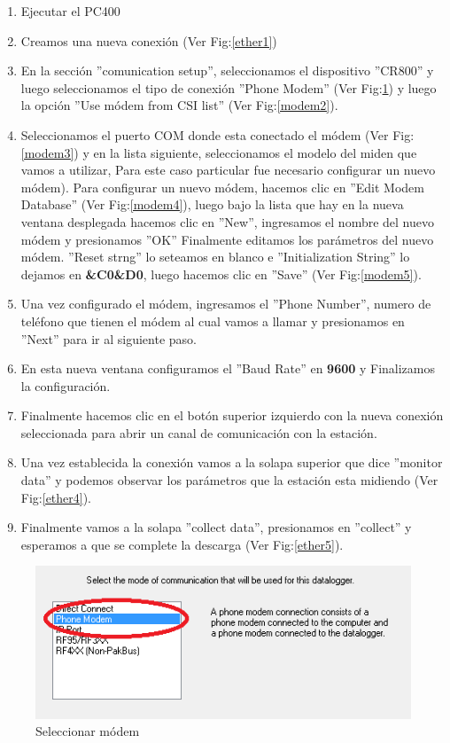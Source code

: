 \begin{enumerate}
\item Ejecutar el PC400
\item Creamos una nueva conexión (Ver Fig:\ref{ether1})
\item En la sección ''comunication setup'', seleccionamos el dispositivo ''CR800'' y luego seleccionamos el tipo de conexión ''Phone Modem'' (Ver Fig:\ref{modem1}) y luego la opción ''Use módem from CSI list'' (Ver Fig:\ref{modem2}).
\item Seleccionamos el puerto COM donde esta conectado el módem (Ver Fig:\ref{modem3}) y en la lista siguiente, seleccionamos el modelo del miden que vamos a utilizar, Para este caso particular fue necesario configurar un nuevo módem).
\subitem Para configurar un nuevo módem, hacemos clic en ''Edit Modem Database'' (Ver Fig:\ref{modem4}), luego bajo la lista que hay en la nueva ventana desplegada hacemos clic en ''New'', ingresamos el nombre del nuevo módem y presionamos ''OK''
\subitem Finalmente editamos los parámetros del nuevo módem. ''Reset strng'' lo seteamos en blanco e ''Initialization String'' lo dejamos en \textbf{\&C0\&D0}, luego hacemos clic en ''Save'' (Ver Fig:\ref{modem5}). 
\item Una vez configurado el módem, ingresamos el ''Phone Number'', numero de teléfono que tienen el módem al cual vamos a llamar y presionamos en ''Next'' para ir al siguiente paso.
\item En esta nueva ventana configuramos el ''Baud Rate'' en \textbf{9600} y Finalizamos la configuración.
\item Finalmente hacemos clic en el botón superior izquierdo con la nueva conexión seleccionada para abrir un canal de comunicación con la estación.
\item Una vez establecida la conexión vamos a la solapa superior que dice ''monitor data'' y podemos observar los parámetros que la estación esta midiendo (Ver Fig:\ref{ether4}).
\item Finalmente vamos a la solapa ''collect data'', presionamos en ''collect'' y esperamos a que se complete la descarga (Ver Fig:\ref{ether5}).
\end{enumerate}
\begin{figure}[h!]
        \centering
        \includegraphics[width=320pt]{images/modem1}
        \caption{Seleccionar módem}
        \label{modem1}
\end{figure}
